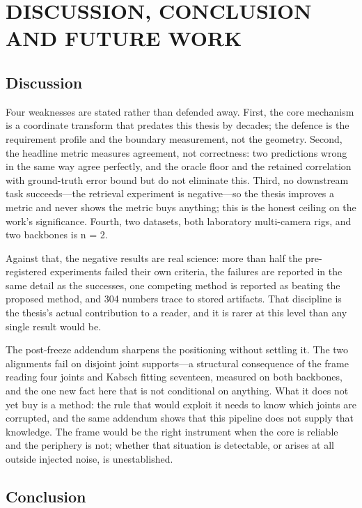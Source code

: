 \documentclass[12pt,a4paper]{report}
\begin{document}
\chapter{DISCUSSION, CONCLUSION AND FUTURE WORK}
\label{ch:conclusion}

\section{Discussion}

Four weaknesses are stated rather than defended away. First, the core mechanism is a coordinate transform that predates this thesis by decades; the defence is the requirement profile and the boundary measurement, not the geometry. Second, the headline metric measures agreement, not correctness: two predictions wrong in the same way agree perfectly, and the oracle floor and the retained correlation with ground-truth error bound but do not eliminate this. Third, no downstream task succeeds---the retrieval experiment is negative---so the thesis improves a metric and never shows the metric buys anything; this is the honest ceiling on the work's significance. Fourth, two datasets, both laboratory multi-camera rigs, and two backbones is n = 2.

Against that, the negative results are real science: more than half the pre-registered experiments failed their own criteria, the failures are reported in the same detail as the successes, one competing method is reported as beating the proposed method, and 304 numbers trace to stored artifacts. That discipline is the thesis's actual contribution to a reader, and it is rarer at this level than any single result would be.

The post-freeze addendum sharpens the positioning without settling it. The two alignments fail on disjoint joint supports---a structural consequence of the frame reading four joints and Kabsch fitting seventeen, measured on both backbones, and the one new fact here that is not conditional on anything. What it does not yet buy is a method: the rule that would exploit it needs to know which joints are corrupted, and the same addendum shows that this pipeline does not supply that knowledge. The frame would be the right instrument when the core is reliable and the periphery is not; whether that situation is detectable, or arises at all outside injected noise, is unestablished.

\section{Conclusion}
\end{document}
